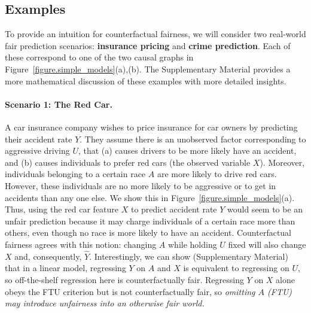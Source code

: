 \subsection{Examples}
\label{sec:further_examples}

To provide an intuition for counterfactual fairness, we will consider
two real-world fair prediction scenarios: \textbf{insurance pricing}
and \textbf{crime prediction}. Each of these correspond to one of the
two causal graphs in Figure~\ref{figure.simple_models}(a),(b). The
Supplementary Material provides a more mathematical discussion of
these examples with more detailed insights.

\paragraph{Scenario 1: The Red Car.}
A car insurance company wishes to price insurance for car owners by
predicting their accident rate $Y$. They assume there is an unobserved
factor corresponding to aggressive driving $U$, that (a) causes
drivers to be more likely have an accident, and (b) causes individuals
to prefer red cars (the observed variable $X$). Moreover, individuals
belonging to a certain race $A$ are more likely to drive red
cars. However, these individuals are no more likely to be aggressive
or to get in accidents than any one else. We show this in
Figure~\ref{figure.simple_models}(a). Thus, using the red car feature
$X$ to predict accident rate $Y$ would seem to be an unfair prediction
because it may charge individuals of a certain race more than others,
even though no race is more likely to have an accident. Counterfactual
fairness agrees with this notion: changing $A$ while holding $U$ fixed
will also change $X$ and, consequently, $\hat Y$. Interestingly, we
can show (Supplementary Material) that in a linear model, regressing
$Y$ on $A$ and $X$ is equivalent to regressing on $U$, so
off-the-shelf regression here is counterfactually fair. Regressing $Y$
on $X$ alone obeys the FTU criterion but is not counterfactually fair,
so {\em omitting $A$ (FTU) may introduce unfairness into an otherwise
  fair world.}
%
